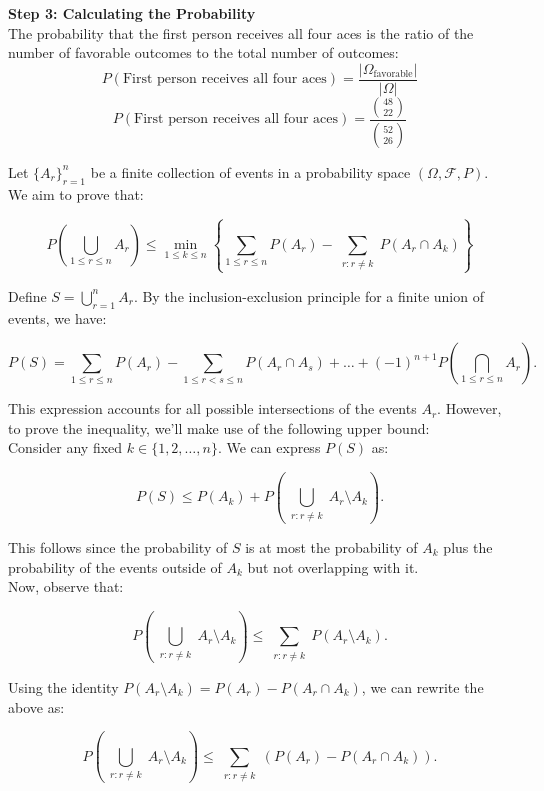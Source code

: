 \begin{example}
\textbf{Step 3: Calculating the Probability}\\

The probability that the first person receives all four aces is the ratio of the number of favorable outcomes to the total number of outcomes:
\[
P(\text{First person receives all four aces}) = \frac{|\Omega_{\text{favorable}}|}{|\Omega|}
\]
\[
P(\text{First person receives all four aces}) = \frac{\binom{48}{22}}{\binom{52}{26}}
\]
\end{example}

\begin{example}
    Let $\{A_r\}_{r=1}^n$ be a finite collection of events in a probability space $(\Omega, \mathcal{F}, P)$. We aim to prove that:

\[
P\left(\bigcup_{1 \leq r \leq n} A_r\right) \leq \min_{1 \leq k \leq n} \left\{ \sum_{1 \leq r \leq n} P(A_r) - \sum_{\substack{r: r \neq k}} P(A_r \cap A_k) \right\}
\]

Define $S = \bigcup_{r=1}^{n} A_r$. By the inclusion-exclusion principle for a finite union of events, we have:

\[
P(S) = \sum_{1 \leq r \leq n} P(A_r) - \sum_{1 \leq r < s \leq n} P(A_r \cap A_s) + \ldots + (-1)^{n+1} P\left(\bigcap_{1 \leq r \leq n} A_r\right).
\]

This expression accounts for all possible intersections of the events $A_r$. However, to prove the inequality, we'll make use of the following upper bound:\\

Consider any fixed $k \in \{1, 2, \ldots, n\}$. We can express $P(S)$ as:

\[
P(S) \leq P(A_k) + P\left(\bigcup_{\substack{r: r \neq k}} A_r \setminus A_k\right).
\]

This follows since the probability of $S$ is at most the probability of $A_k$ plus the probability of the events outside of $A_k$ but not overlapping with it.\\

Now, observe that:

\[
P\left(\bigcup_{\substack{r: r \neq k}} A_r \setminus A_k\right) \leq \sum_{\substack{r: r \neq k}} P(A_r \setminus A_k).
\]

Using the identity $P(A_r \setminus A_k) = P(A_r) - P(A_r \cap A_k)$, we can rewrite the above as:

\[
P\left(\bigcup_{\substack{r: r \neq k}} A_r \setminus A_k\right) \leq \sum_{\substack{r: r \neq k}} \left(P(A_r) - P(A_r \cap A_k)\right).
\]


\end{example}
